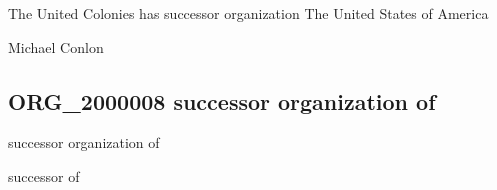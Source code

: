 \documentclass[letterpaper,10pt,english]{sphinxmanual}
\begin{document}
\begin{sphinxShadowBox}

\sphinxAtStartPar
{\hyperref[\detokenize{doc-ORG_2000008::doc}]{}}
\end{sphinxShadowBox}

\begin{sphinxShadowBox}

\sphinxAtStartPar
The United Colonies has successor organization The United States of America
\end{sphinxShadowBox}

\begin{sphinxShadowBox}

\sphinxAtStartPar
{}
\end{sphinxShadowBox}

\begin{sphinxShadowBox}

\sphinxAtStartPar
Michael Conlon 
\end{sphinxShadowBox}
\begin{quote}

\ignorespaces \end{quote}


\subsection{ORG\_2000008 \sphinxhyphen{} successor organization of}
\label{\detokenize{doc-ORG_2000008:org-2000008-successor-organization-of}}\label{\detokenize{doc-ORG_2000008:index-0}}\label{\detokenize{doc-ORG_2000008::doc}}
\begin{sphinxShadowBox}

\sphinxAtStartPar
successor organization of
\end{sphinxShadowBox}

\begin{sphinxShadowBox}

\sphinxAtStartPar
successor of
\end{sphinxShadowBox}
\end{document}
